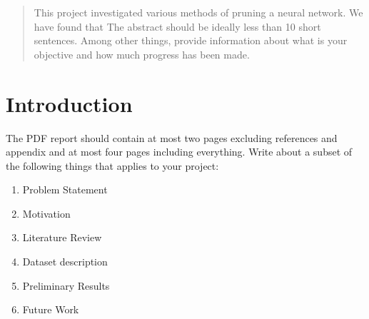 \documentclass{article}
\begin{document}

\printAffiliationsAndNotice{}

\begin{abstract}
This project investigated various methods of pruning a neural network. We have found that
The abstract should be ideally less than 10 short sentences. Among other things, provide information about what is your objective and how much progress has been made. 
\end{abstract}

\section{Introduction}
\label{introduction}
The PDF report should contain at most two pages excluding references and appendix and at most four pages including everything. Write about a subset of the following things that applies to your project:

\begin{enumerate}
	\item Problem Statement
	\item Motivation
	\item Literature Review
	\item Dataset description
	\item Preliminary Results
	\item Future Work
\end{enumerate}
\end{document}
